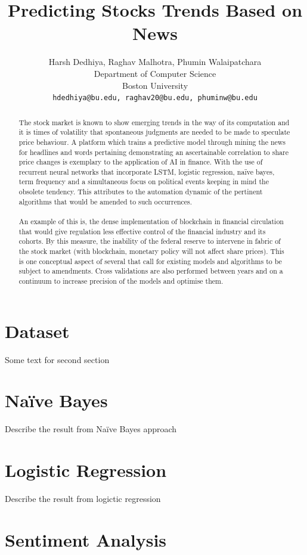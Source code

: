 \documentclass{article}
\title{Predicting Stocks Trends Based on News}
\author{
Harsh Dedhiya, Raghav Malhotra, Phumin Walaipatchara\\
Department of Computer Science\\
Boston University\\
\texttt{hdedhiya@bu.edu, raghav20@bu.edu, phuminw@bu.edu}\\
}
\begin{document}
\maketitle
\begin{abstract}
The stock market is known to show emerging trends in the way of its computation and it is times
 of volatility that spontaneous judgments are needed to be made to speculate price behaviour.
 A platform which trains a predictive model through mining the news for headlines and words
 pertaining demonstrating an ascertainable correlation to share price changes is exemplary to
 the application of AI in finance. With the use of recurrent neural networks that incorporate LSTM,
 logistic regression, naïve bayes, term frequency and a simultaneous focus on political events keeping
 in mind the obsolete tendency. This attributes to the automation dynamic of the pertinent algorithms
 that would be amended to such occurrences.
 \\\\
 An example of this is, the dense implementation of blockchain in financial circulation that would
 give regulation less effective control of the financial industry and its cohorts. By this measure,
 the inability of the federal reserve to intervene in fabric of the stock market (with blockchain,
 monetary policy will not affect share prices). This is one conceptual aspect of several that call for
 existing models and algorithms to be subject to amendments. Cross validations are also performed between
 years and on a continuum to increase precision of the models and optimise them.
\end{abstract}
\section{Dataset}
Some text for second section

\section{Na\"ive Bayes}
Describe the result from Na\"ive Bayes approach

\section{Logistic Regression}
Describe the result from logictic regression

\section{Sentiment Analysis}
\end{document}
